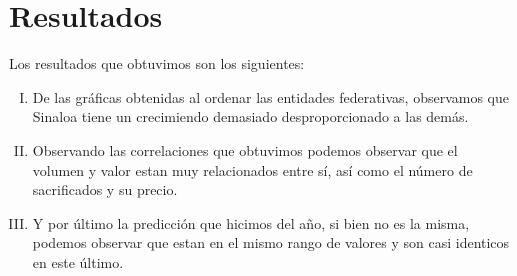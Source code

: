 \section*{Resultados}
Los resultados que obtuvimos son los siguientes:
\begin{enumerate}[I.]
    \item De las gráficas obtenidas al ordenar las entidades federativas, observamos que Sinaloa tiene un crecimiendo demasiado desproporcionado a las demás.
    \item Observando las correlaciones que obtuvimos podemos observar que el volumen y valor estan muy relacionados entre sí, así como el número de sacrificados y su precio.
    \item Y por último la predicción que hicimos del año, si bien no es la misma, podemos observar que estan en el mismo rango de valores y son casi identicos en este último.
\end{enumerate}